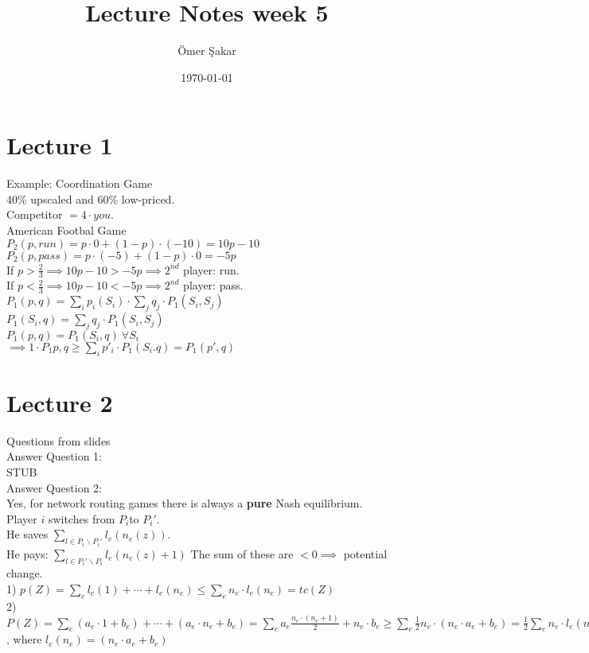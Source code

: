 \documentclass[12pt]{scrartcl}
\title{Lecture Notes week 5}
\author{\"Omer \c Sakar}
\date{\today}
\begin{document}
\maketitle
\tableofcontents
\newpage

\section{Lecture 1}
Example: Coordination Game\\
40\% upscaled and 60\% low-priced.\\
Competitor $= 4 \cdot you$.\\

\noindent American Footbal Game\\
\noindent $P_{2}(p,run) = p\cdot 0 + (1-p)\cdot(-10) = 10p - 10$\\
$P_{2}(p,pass) = p\cdot (-5) + (1-p)\cdot 0 = -5p$\\


\noindent If $p > \frac{2}{3} \implies 10p - 10 > -5p \implies 2^{nd}$ player: run.\\ 
If $p < \frac{2}{3} \implies 10p - 10 < -5p \implies 2^{nd}$ player: pass.\\

\noindent $P_{1}(p,q) = \sum\limits_{i} p_{i}(S_{i})\cdot \sum\limits_{j} q_{j}\cdot P_{1}(S_{i}, S_{j})$\\
$P_{1}(S_{i}, q) = \sum\limits_{j} q_{j}\cdot P_{1}(S_{i}, S_{j})$\\
$P_{1}(p,q) = P_{1}(S_{i}, q)\ \forall S_{i}$\\
$\implies 1\cdot P_{1}p,q \geq \sum\limits_{i} p'_{i}\cdot P_{1}(S_{i}.q) = P_{1}(p',q)$


\clearpage
\section{Lecture 2} 
Questions from slides\\
Answer Question 1:\\
STUB\\
Answer Question 2:\\
Yes, for network routing games there is always a \textbf{pure} Nash equilibrium.\\

\noindent Player $i$ switches from $P_{i}$to $P_{i}'$.\\
He saves $\sum\limits_{l\in P_{i}\backslash P_{i}'} l_{e}(n_{e}(z))$.\\
He pays: $\sum\limits_{l\in P_{i}'\backslash P_{i}} l_{e}(n_{e}(z) +1)$
The sum of these are $< 0 \implies$ potential change.\\

1) $p(Z) = \sum\limits_{e} l_{e}(1) + \cdots + l_{e}(n_{e}) \leq \sum\limits_{e} n_{e}\cdot l_{e}(n_{e}) = tc(Z)$\\
2)$P(Z) = \sum\limits_{e} (a_{e}\cdot 1 + b_{e}) + \cdots + (a_{e}\cdot n_{e} + b_{e}) = \sum\limits_{e} a_{e} \frac{n_{e}\cdot (n_{e}+1)}{2} + n_{e}\cdot b_{e}\geq \sum\limits_{e} \frac{1}{2} n_{e}\cdot (n_{e}\cdot a_{e} + b_{e}) = \frac{1}{2} \sum\limits_{e} n_{e}\cdot l_{e}(n_{e}) = \frac{1}{2}\cdot tc(Z)$, where $l_{e}(n_{e}) = (n_{e}\cdot a_{e} + b_{e})$\\
\end{document}
